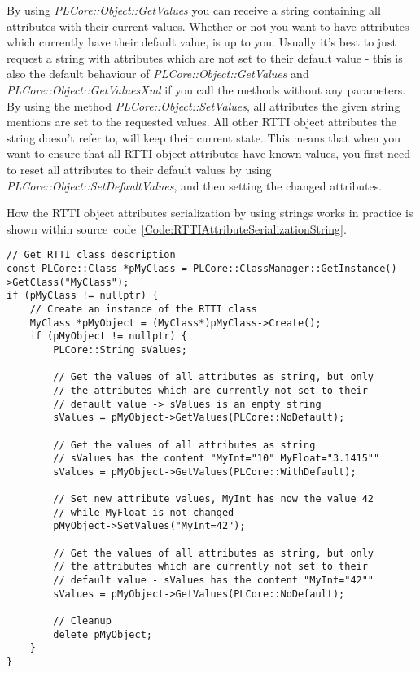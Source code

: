 By using \emph{PLCore::Object::GetValues} you can receive a string containing all attributes with their current values. Whether or not you want to have attributes which currently have their default value, is up to you. Usually it's best to just request a string with attributes which are not set to their default value - this is also the default behaviour of \emph{PLCore::Object::GetValues} and \emph{PLCore::Object::GetValuesXml} if you call the methods without any parameters. By using the method \emph{PLCore::Object::SetValues}, all attributes the given string mentions are set to the requested values. All other RTTI object attributes the string doesn't refer to, will keep their current state. This means that when you want to ensure that all RTTI object attributes have known values, you first need to reset all attributes to their default values by using \emph{PLCore::Object::SetDefaultValues}, and then setting the changed attributes.

How the RTTI object attributes serialization by using strings works in practice is shown within source~code~\ref{Code:RTTIAttributeSerializationString}.
\begin{lstlisting}[label=Code:RTTIAttributeSerializationString,caption={RTTI object attributes serialization by using strings}]
// Get RTTI class description
const PLCore::Class *pMyClass = PLCore::ClassManager::GetInstance()->GetClass("MyClass");
if (pMyClass != nullptr) {
	// Create an instance of the RTTI class
	MyClass *pMyObject = (MyClass*)pMyClass->Create();
	if (pMyObject != nullptr) {
		PLCore::String sValues;

		// Get the values of all attributes as string, but only
		// the attributes which are currently not set to their
		// default value -> sValues is an empty string
		sValues = pMyObject->GetValues(PLCore::NoDefault);

		// Get the values of all attributes as string
		// sValues has the content "MyInt="10" MyFloat="3.1415""
		sValues = pMyObject->GetValues(PLCore::WithDefault);

		// Set new attribute values, MyInt has now the value 42
		// while MyFloat is not changed
		pMyObject->SetValues("MyInt=42");

		// Get the values of all attributes as string, but only
		// the attributes which are currently not set to their
		// default value - sValues has the content "MyInt="42""
		sValues = pMyObject->GetValues(PLCore::NoDefault);

		// Cleanup
		delete pMyObject;
	}
}
\end{lstlisting}

